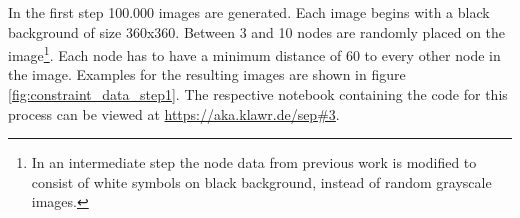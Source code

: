 In the first step 100.000 images are generated.
Each image begins with a black background of size 360x360.
Between 3 and 10 nodes are randomly placed on the image\footnote{In an intermediate step the node data from previous work is modified to consist of white symbols on black background, instead of random grayscale images.}.
Each node has to have a minimum distance of 60 to every other node in the image.
Examples for the resulting images are shown in figure \ref{fig:constraint_data_step1}.
The respective notebook containing the code for this process can be viewed at \url{https://aka.klawr.de/sep\#3}.

\begin{figure}
    \centering
    \begin{subfigure}[b]{0.19\textwidth}
    \end{subfigure}
    \begin{subfigure}[b]{0.19\textwidth}

\end{subfigure}
\end{figure}
